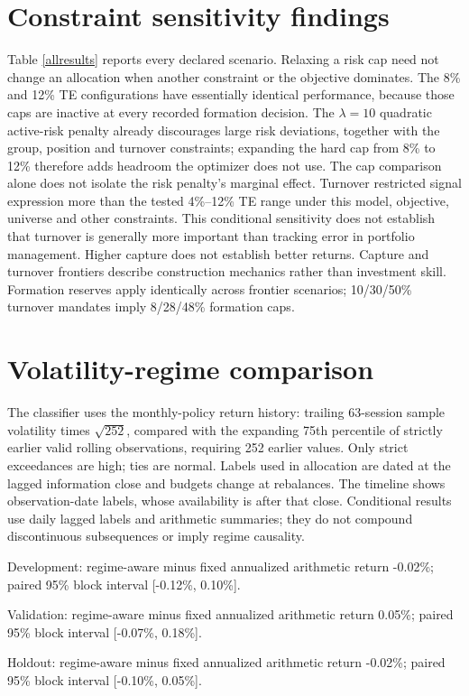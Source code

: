 \documentclass[11pt,a4paper]{article}
\begin{document}
\section{Constraint sensitivity findings}
Table \ref{allresults} reports every declared scenario. Relaxing a risk cap need
not change an allocation when another constraint or the objective dominates.
The 8\% and 12\% TE configurations have essentially identical performance,
because those caps are inactive at every recorded formation decision.
The $\lambda=10$ quadratic active-risk penalty already discourages large risk
deviations, together with the group, position and turnover constraints; expanding
the hard cap from 8\% to 12\% therefore adds headroom the optimizer does not use.
The cap comparison alone does not isolate the risk penalty's marginal effect.
Turnover restricted
signal expression more than the tested 4\%--12\% TE range under this model,
objective, universe and other constraints. This conditional sensitivity does not
establish that turnover is generally more important than tracking error in
portfolio management. Higher capture does not establish better returns.
Capture and turnover frontiers describe construction mechanics rather than
investment skill. Formation reserves apply identically across frontier scenarios;
10/30/50\% turnover mandates imply 8/28/48\% formation caps.
\section{Volatility-regime comparison}
The classifier uses the monthly-policy return history: trailing 63-session
sample volatility times $\sqrt{252}$, compared with the expanding 75th percentile
of strictly earlier valid rolling observations, requiring 252 earlier values.
Only strict exceedances are high; ties are normal. Labels used in allocation are
dated at the lagged information close and budgets change at rebalances.
The timeline shows observation-date labels, whose availability is after that
close. Conditional results use daily lagged labels and arithmetic summaries;
they do not compound discontinuous subsequences or imply regime causality.

Development: regime-aware minus fixed annualized arithmetic return -0.02\%; paired 95\% block interval [-0.12\%, 0.10\%].


Validation: regime-aware minus fixed annualized arithmetic return 0.05\%; paired 95\% block interval [-0.07\%, 0.18\%].


Holdout: regime-aware minus fixed annualized arithmetic return -0.02\%; paired 95\% block interval [-0.10\%, 0.05\%].
\end{document}
